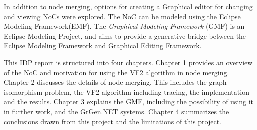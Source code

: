 In addition to node merging, options for creating a Graphical editor for changing and viewing NoCs were explored. The NoC can be modeled using the Eclipse Modeling Framework(EMF). 
The \textit{Graphical Modeling Framework} (GMF) is an Eclipse Modeling Project, and aims to provide a generative bridge between the Eclipse Modeling Framework and Graphical Editing Framework. 

This IDP report is structured into four chapters. Chapter 1 provides an overview of the NoC and motivation for using the VF2 algorithm in node merging. 
Chapter 2 discusses the details of node merging. This includes the graph isomorphism problem, the VF2 algorithm including tracing, the implementation and the results. 
Chapter 3 explains the GMF, including the possibility of using it in further work, and the GrGen.NET systems. 
Chapter 4 summarizes the conclusions drawn from this project and the limitations of this project. 


